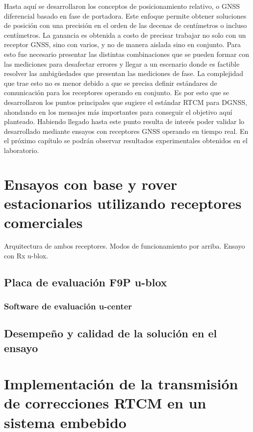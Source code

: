 \documentclass[a4paper,12pt,oneside,onecolumn,final,openright]{book}%
\begin{document}
	Hasta aquí se desarrollaron los conceptos de posicionamiento relativo, o GNSS diferencial basado en fase de portadora. Este enfoque permite obtener soluciones de posición con una precisión en el orden de las decenas de centímetros o incluso centímetros. La ganancia es obtenida a costo de precisar trabajar no solo con un receptor GNSS, sino con varios, y no de manera aislada sino en conjunto. Para esto fue necesario presentar las distintas combinaciones que se pueden formar con las mediciones para desafectar errores y llegar a un escenario donde es factible resolver las ambigüedades que presentan las mediciones de fase. La complejidad que trae esto no es menor debido a que se precisa definir estándares de comunicación para los receptores operando en conjunto. Es por esto que se desarrollaron los puntos principales que sugiere el estándar RTCM para DGNSS, ahondando en los mensajes más importantes para conseguir el objetivo aquí planteado. Habiendo llegado hasta este punto resulta de interés poder validar lo desarrollado mediante ensayos con receptores GNSS operando en tiempo real. En el próximo capítulo se podrán observar resultados experimentales obtenidos en el laboratorio.
\chapter{Ensayos con base y rover estacionarios utilizando receptores comerciales}
Arquitectura de ambos receptores. Modos de funcionamiento por arriba. Ensayo con Rx u-blox.
\section{Placa de evaluación F9P u-blox}
\subsection{Software de evaluación u-center}
\section{Desempeño y calidad de la solución en el ensayo}
\chapter{Implementación de la transmisión de correcciones RTCM en un sistema embebido} 
\end{document}
